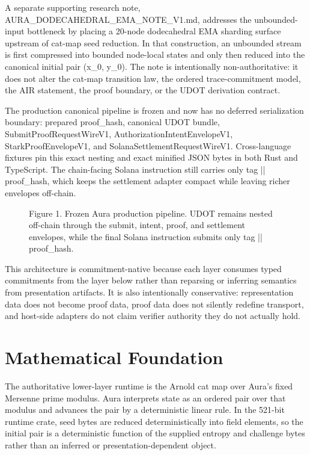 \documentclass[conference]{IEEEtran}
\begin{document}
A separate supporting research note, AURA\_DODECAHEDRAL\_EMA\_NOTE\_V1.md, addresses the unbounded-input bottleneck by placing a 20-node dodecahedral EMA sharding surface upstream of cat-map seed reduction. In that construction, an unbounded stream is first compressed into bounded node-local states and only then reduced into the canonical initial pair (x\_0, y\_0). The note is intentionally non-authoritative: it does not alter the cat-map transition law, the ordered trace-commitment model, the AIR statement, the proof boundary, or the UDOT derivation contract.

The production canonical pipeline is frozen and now has no deferred serialization boundary: prepared proof\_hash, canonical UDOT bundle, SubmitProofRequestWireV1, AuthorizationIntentEnvelopeV1, StarkProofEnvelopeV1, and SolanaSettlementRequestWireV1. Cross-language fixtures pin this exact nesting and exact minified JSON bytes in both Rust and TypeScript. The chain-facing Solana instruction still carries only tag || proof\_hash, which keeps the settlement adapter compact while leaving richer envelopes off-chain.

\begin{figure}[t]
\centering

\caption{Figure 1. Frozen Aura production pipeline. UDOT remains nested off-chain through the submit, intent, proof, and settlement envelopes, while the final Solana instruction submits only tag || proof\_hash.}
\end{figure}
This architecture is commitment-native because each layer consumes typed commitments from the layer below rather than reparsing or inferring semantics from presentation artifacts. It is also intentionally conservative: representation data does not become proof data, proof data does not silently redefine transport, and host-side adapters do not claim verifier authority they do not actually hold.

\section{Mathematical Foundation}
The authoritative lower-layer runtime is the Arnold cat map over Aura's fixed Mersenne prime modulus. Aura interprets state as an ordered pair over that modulus and advances the pair by a deterministic linear rule. In the 521-bit runtime crate, seed bytes are reduced deterministically into field elements, so the initial pair is a deterministic function of the supplied entropy and challenge bytes rather than an inferred or presentation-dependent object.
\end{document}
